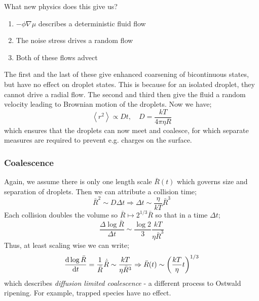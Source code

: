 What new physics does this give us?
\begin{enumerate}
\item $-\phi \nabla \mu$ describes a deterministic fluid flow
\item The noise stress drives a random flow
\item Both of these flows advect
\end{enumerate}
The first and the last of these give enhanced coarsening of bicontinuous states, but have no effect on droplet states. This is because for an isolated droplet, they cannot drive a radial flow. The second and third then give the fluid a random velocity leading to Brownian motion of the droplets. Now we have;
\begin{equation*}
\left< r^2 \right> \propto Dt, \quad D = \frac{kT}{4\pi \eta R}
\end{equation*}
which ensures that the droplets can now meet and coalesce, for which separate measures are required to prevent e.g. charges on the surface.
\subsubsection*{Coalescence}
Again, we assume there is only one length scale $\bar{R}(t)$ which governs size and separation of droplets. Then we can attribute a collision time;
\begin{equation*}
\bar{R}^2 \sim D\Delta t \Rightarrow \Delta t \sim \frac{\eta}{kT}\bar{R}^3
\end{equation*}
Each collision doubles the volume so $\bar{R}\mapsto 2^{1/3}\bar{R}$ so that in a time $\Delta t$;
\begin{equation*}
\frac{\Delta \log \bar{R}}{\Delta t} \sim \frac{\log 2}{3}\frac{kT}{\eta \bar{R}^3}
\end{equation*}
Thus, at least scaling wise we can write;
\begin{equation*}
\frac{\ud \log \bar{R}}{\ud t} = \frac{1}{\bar{R}}\dot{\bar{R}} \sim \frac{kT}{\eta \bar{R}^3} \Rightarrow \bar{R}(t) \sim \left(\frac{kT}{\eta}t\right)^{1/3}
\end{equation*}
which describes \emph{diffusion limited coalescence} - a different process to Ostwald ripening. For example, trapped species have no effect. 
